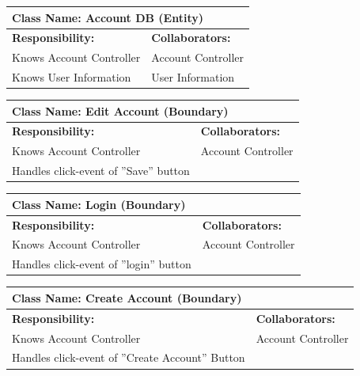 \documentclass[]{article}
\begin{document}
\begin{table}[H]
    \centering
    \begin{tabular}{|p{}|p{}|}
        \hline
        \multicolumn{2}{|l|}{\textbf{Class Name:} Account DB (Entity)} \\
        \hline
        \textbf{Responsibility:} & \textbf{Collaborators:} \\
        \hline
        Knows Account Controller & Account Controller \\
        Knows User Information & User Information \\
        \hline
    \end{tabular}
    \label{tab:account_db}
\end{table}

\begin{table}[H]
    \centering
    \begin{tabular}{|p{}|p{}|}
        \hline
        \multicolumn{2}{|l|}{\textbf{Class Name:} Edit Account (Boundary)} \\
        \hline
        \textbf{Responsibility:} & \textbf{Collaborators:} \\
        \hline
        Knows Account Controller & Account Controller \\
        Handles click-event of ”Save” button & \\
        \hline
    \end{tabular}
    \label{tab:edit_account}
\end{table}

\begin{table}[H]
    \centering
    \begin{tabular}{|p{}|p{}|}
        \hline
        \multicolumn{2}{|l|}{\textbf{Class Name:} Login (Boundary)} \\
        \hline
        \textbf{Responsibility:} & \textbf{Collaborators:} \\
        \hline
        Knows Account Controller & Account Controller \\
        Handles click-event of ”login” button &  \\
        \hline
    \end{tabular}
    \label{tab:login}
\end{table}

\begin{table}[H]
    \centering
    \begin{tabular}{|p{}|p{}|}
        \hline
        \multicolumn{2}{|l|}{\textbf{Class Name:} Create Account (Boundary)} \\
        \hline
        \textbf{Responsibility:} & \textbf{Collaborators:} \\
        \hline
        Knows Account Controller & Account Controller \\
        Handles click-event of ”Create Account” Button & \\
        \hline
    \end{tabular}
    \label{tab:create_account}
\end{table}
\end{document}
